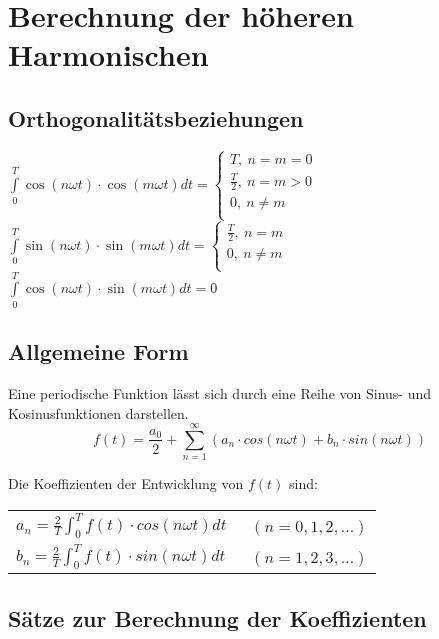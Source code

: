 \section{Berechnung der höheren Harmonischen}
\subsection{Orthogonalitätsbeziehungen}


            $\int\limits_0^T \cos(n\omega t)\cdot \cos(m\omega t)dt=
            \begin{cases}
            T,\ n=m=0\\
            \frac{T}{2},\ n=m>0\\ 
            0,\ n\neq m\\
            \end{cases}$\\
            
            
           $\int\limits_0^T \sin(n\omega t)\cdot \sin(m\omega t)dt=
           \begin{cases}
           \frac{T}{2},\ n=m\\
           0,\ n\neq m\\
           \end{cases}$\\
           $\int\limits_0^T \cos(n\omega t)\cdot \sin(m\omega t)dt=0$
           
\subsection{Allgemeine Form}
Eine periodische Funktion lässt sich durch eine Reihe von Sinus- und Kosinusfunktionen darstellen.
$$f(t) = \frac{a_{0}}{2}+\sum_{n = 1}^{\infty} (a_{n} \cdot cos(n \omega t)+ b_{n} \cdot sin(n \omega t))$$

Die Koeffizienten der Entwicklung von $f(t)$ sind:\\
\begin{tabular}{ll}
  $a_{n} = \frac{2}{T}\int_{0}^{T}f(t) \cdot cos(n \omega t)dt$   &\ $(n = 0,1,2,...)$\\
  $b_{n} = \frac{2}{T}\int_{0}^{T}f(t) \cdot sin(n \omega t)dt$   &\ $(n = 1,2,3,...)$\\
\end{tabular}
\subsection{Sätze zur Berechnung der Koeffizienten}
